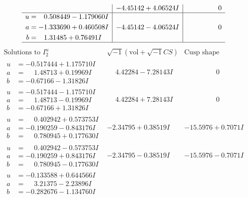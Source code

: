 \documentclass[1p]{elsarticle_modified}
\theoremstyle{definition}
\newcommand{\I}{\sqrt{-1}}
\begin{document}
$$\begin{array}{c|c|c}
 & -4.45142 + 4.06524 I & \phantom{-0.000000 } 0 \\ \hline\begin{aligned}
u &= \phantom{-}0.508449 - 1.179060 I \\
a &= -1.333690 + 0.460508 I \\
b &= \phantom{-}1.31485 + 0.76491 I\end{aligned}
 & -4.45142 - 4.06524 I & \phantom{-0.000000 } 0\\
 \hline 
 \end{array}$$\newpage$$\begin{array}{c|c|c}  
\text{Solutions to }I^u_{2}& \I (\text{vol} + \sqrt{-1}CS) & \text{Cusp shape}\\
 \hline 
\begin{aligned}
u &= -0.517444 + 1.175710 I \\
a &= \phantom{-}1.48713 + 0.19969 I \\
b &= -0.67166 - 1.31826 I\end{aligned}
 & \phantom{-}4.42284 - 7.28143 I & \phantom{-0.000000 } 0 \\ \hline\begin{aligned}
u &= -0.517444 - 1.175710 I \\
a &= \phantom{-}1.48713 - 0.19969 I \\
b &= -0.67166 + 1.31826 I\end{aligned}
 & \phantom{-}4.42284 + 7.28143 I & \phantom{-0.000000 } 0 \\ \hline\begin{aligned}
u &= \phantom{-}0.402942 + 0.573753 I \\
a &= -0.190259 - 0.843176 I \\
b &= \phantom{-}0.780945 + 0.177630 I\end{aligned}
 & -2.34795 + 0.38519 I & -15.5976 + 0.7071 I \\ \hline\begin{aligned}
u &= \phantom{-}0.402942 - 0.573753 I \\
a &= -0.190259 + 0.843176 I \\
b &= \phantom{-}0.780945 - 0.177630 I\end{aligned}
 & -2.34795 - 0.38519 I & -15.5976 - 0.7071 I \\ \hline\begin{aligned}
u &= -0.133588 + 0.644566 I \\
a &= \phantom{-}3.21375 - 2.23896 I \\
b &= -0.282676 - 1.134760 I\end{aligned}

\end{array}$$
\end{document}
